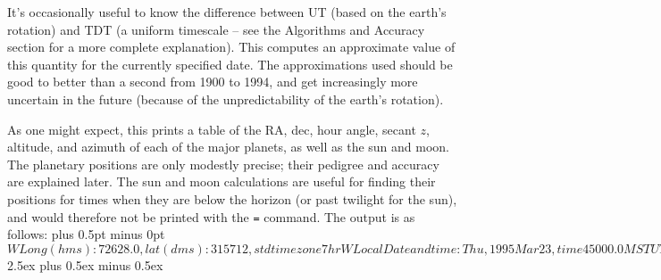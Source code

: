 
It's occasionally useful to know the difference between UT (based on
the earth's rotation) and TDT (a uniform timescale -- see the Algorithms and
Accuracy section for a more complete explanation).  This computes an 
approximate value of this quantity for the currently specified date.  
The approximations
used should be good to better than a second from 1900 to 1994, and get
increasingly more uncertain in the future (because of the unpredictability
of the earth's rotation).
\par
{}

As one might expect, this prints a table of the RA, dec, hour angle,
secant $z$, altitude, and azimuth of each of the major planets, as well
as the sun and moon.    
The planetary positions are only modestly precise;
their pedigree and accuracy are explained later. 
The sun and moon calculations are useful for
finding their positions for times when they are below the horizon (or
past twilight for the sun), and would therefore
not be printed with the {\tt =} command.
The output is as follows:
\parskip 0pt plus 0.5pt minus 0pt
\verbatim$

W Long (hms):  7 26 28.0, lat (dms): 31 57 12, std time zone   7 hr W

Local Date and time: Thu, 1995 Mar 23, time   4 50 00.0  MST
   UT Date and time: Thu, 1995 Mar 23, time  11 50 00.0
Julian date: 2449799.993056   LMST:  16 25 31.8

Planetary positions (epoch of date), accuracy about 0.1 deg:

             RA       dec       HA       sec.z     alt   az

Sun    :   0 08.7     0 57    -7 43      -2.77   -21.1   74.8
Moon   :  17 52.1   -20 05    -1 27       1.79    34.0  155.3

Mercury:  23 01.3    -8 46    -6 36      -4.74   -12.2   92.8
Venus  :  21 47.2   -13 45    -5 22      86.46     0.7  106.7
Mars   :   9 06.7    20 11     7 19     -11.61    -4.9  297.5
Jupiter:  16 56.1   -21 49    -0 31       1.71    35.7  171.2
Saturn :  23 15.6    -6 43    -6 50      -4.09   -14.1   89.1
Uranus :  20 08.6   -20 41    -3 43       3.85    15.0  126.8
Neptune:  19 48.3   -20 33    -3 23       3.15    18.5  130.2
Pluto  :  16 04.1    -6 41     0 21       1.29    51.0  188.5 <-(least accurate)
$
\medskip
\parskip 2.5ex plus 0.5ex minus 0.5ex

